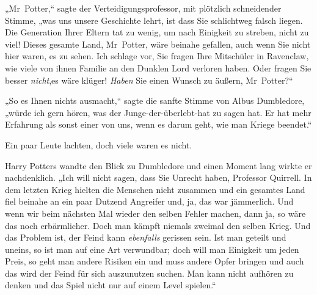 „Mr~Potter,“ sagte der Verteidigungsprofessor, mit plötzlich schneidender Stimme, „was uns unsere Geschichte lehrt, ist dass Sie schlichtweg falsch liegen. Die Generation Ihrer Eltern tat zu wenig, um nach Einigkeit zu streben, nicht zu viel! Dieses gesamte Land, Mr~Potter, wäre beinahe gefallen, auch wenn Sie nicht hier waren, es zu sehen. Ich schlage vor, Sie fragen Ihre Mitschüler in Ravenclaw, wie viele von ihnen Familie an den Dunklen Lord verloren haben. Oder fragen Sie besser \emph{nicht},es wäre klüger! \emph{Haben} Sie einen Wunsch zu äußern, Mr~Potter?“

„So es Ihnen nichts ausmacht,“ sagte die sanfte Stimme von Albus Dumbledore, „würde ich gern hören, was der Junge-der-überlebt-hat zu sagen hat. Er hat mehr Erfahrung als sonst einer von uns, wenn es darum geht, wie man Kriege beendet.“

Ein paar Leute lachten, doch viele waren es nicht.

Harry Potters wandte den Blick zu Dumbledore und einen Moment lang wirkte er nachdenklich. „Ich will nicht sagen, dass Sie Unrecht haben, Professor Quirrell. In dem letzten Krieg hielten die Menschen nicht zusammen und ein gesamtes Land fiel beinahe an ein paar Dutzend Angreifer und, ja, das war jämmerlich. Und wenn wir beim nächsten Mal wieder den selben Fehler machen, dann ja, so wäre das noch erbärmlicher. Doch man kämpft niemals zweimal den selben Krieg. Und das Problem ist, der Feind kann \emph{ebenfalls} gerissen sein. Ist man geteilt und uneins, so ist man auf eine Art verwundbar; doch will man Einigkeit um jeden Preis, so geht man andere Risiken ein und muss andere Opfer bringen und auch das wird der Feind für sich auszunutzen suchen. Man kann nicht aufhören zu denken und das Spiel nicht nur auf einem Level spielen.“

